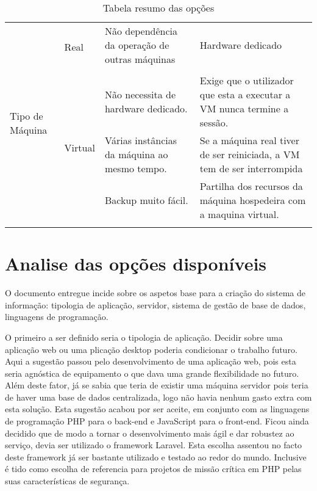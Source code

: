 \begin{longtable}{|p{}|p{}|p{}|p{}|}
	\multirow{5}{*}{Tipo de Máquina}                                        & \multirow{2}{*}{Real}                                 & Não dependência da operação de outras máquinas                      & Hardware dedicado                                                                                   \\
	&                                                       &                                                                     &                                                                                                     \\ \cline{2-4}
	& \multirow{3}{*}{Virtual}                              & Não necessita de hardware dedicado.                                 & Exige que o utilizador que esta a executar a VM nunca termine a sessão.                             \\
	&                                                       & Várias instâncias da máquina ao mesmo tempo.                        & Se a máquina real tiver de ser reiniciada, a VM tem de ser interrompida                             \\
	&                                                       & Backup muito fácil.                                                 & Partilha dos recursos da máquina hospedeira com a maquina virtual.                                  \\
	\hline
	\caption{Tabela resumo das opções}
	\label{tab:opcoes_dev}
\end{longtable}



\section{Analise das opções disponíveis}
O documento entregue incide sobre os aspetos base para a criação do sistema de informação: tipologia de aplicação, servidor, sistema de gestão de base de dados, linguagens de programação.

O primeiro a ser definido seria o tipologia de aplicação. Decidir sobre uma aplicação web ou uma plicação desktop poderia condicionar o trabalho futuro. Aqui a sugestão passou pelo desenvolvimento de uma aplicação web, pois esta seria agnóstica de equipamento o que dava uma grande flexibilidade no futuro. Além deste fator, já se sabia que teria de existir uma máquina servidor pois teria de haver uma base de dados centralizada, logo não havia nenhum gasto extra com esta solução. Esta sugestão acabou por ser aceite, em conjunto com as linguagens de programação PHP para o back-end e JavaScript para o front-end. Ficou ainda decidido que de modo a tornar o desenvolvimento mais ágil e dar robustez ao serviço, devia ser utilizado o framework Laravel. Esta escolha assentou no facto deste framework já ser bastante utilizado e testado ao redor do mundo. Inclusive é tido como escolha de referencia para projetos de missão crítica em PHP pelas suas características de segurança\cite{Mansuri2018}.

